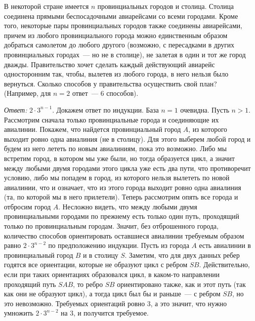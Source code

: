 В некоторой стране имеется $n$ провинциальных городов и столица.
Столица соединена прямыми беспосадочными авиарейсами со всеми городами.
Кроме того, некоторые пары провинциальных городов также соединены авиарейсами,
причем из любого провинциального города можно единственным образом добраться
самолетом до любого другого
(возможно, с пересадками в других провинциальных городах~--- но не в столице),
не залетая в один и тот же город дважды.
Правительство хочет сделать каждый действующий авиарейс односторонним
так, чтобы, вылетев из любого города, в него нельзя было вернуться.
Сколько способов у правительства осуществить свой план?
(Например, для $n = 2$ ответ~--- $6$ способов).

\solution
\emph{Ответ:} $2 \cdot 3^{n-1}$.
Докажем ответ по индукции.
База $n = 1$ очевидна.
Пусть $n > 1$.
Рассмотрим сначала только провинциальные города и соединяющие их авиалинии.
Покажем, что найдется провинциальный город $A$, из которого выходит ровно одна
авиалиния (не в столицу).
Для этого выберем любой город и будем из него лететь по новым авиалиниям, пока
это возможно.
Либо мы встретим город, в котором мы уже были, но тогда образуется цикл, а
значит между любыми двумя городами этого цикла уже есть два пути, что
противоречит условию, либо мы попадем в город, из которого нельзя вылететь по
новой авиалинии, что и означает, что из этого города выходит ровно одна
авиалиния (та, по которой мы в него прилетели).
Теперь рассмотрим опять все города и отбросим город $A$.
Несложно видеть, что между любыми двумя провинциальными городами по прежнему
есть только один путь, проходящий только по провинциальным городам.
Значит, без отброшенного города, количество способов ориентировать оставшиеся
авиалинии требуемым образом равно $2 \cdot 3^{n-2}$ по предположению индукции.
Пусть из города $A$ есть авиалинии в провинциальный город $B$ и в столицу $S$.
Заметим, что для двух данных ребер годятся все ориентации, которые не образуют
цикл с ребром $SB$.
Действительно, если при таких ориентациях образовался цикл, в каком-то
направлении проходящий путь $SAB$, то ребро $SB$ ориентировано также, как и
этот путь (так как они не образуют цикл), а тогда цикл был бы и раньше~---
с ребром $SB$, но это невозможно.
Требуемых ориентаций ровно 3, а это значит, что нужно умножить
$2 \cdot 3^{n-2}$ на 3, и получится требуемое. 

